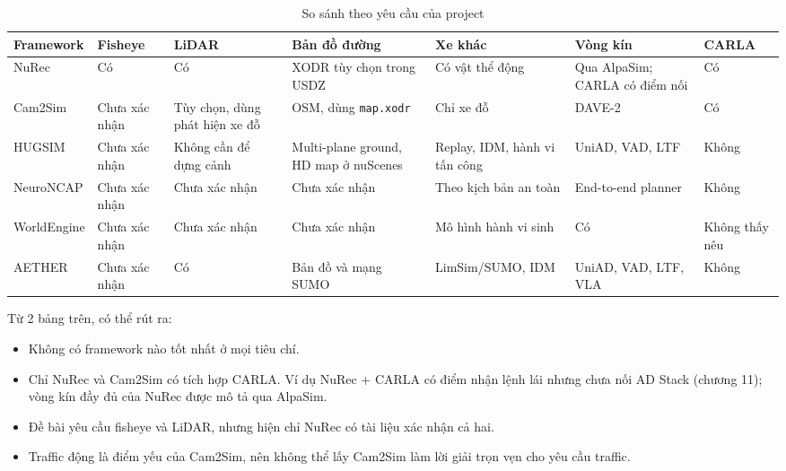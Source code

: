 \begin{table}[H]
  \centering
  \footnotesize
  \caption{So sánh theo yêu cầu của project}
  \begin{tabularx}{\linewidth}{>{\raggedright\arraybackslash}p{1.85cm} >{\raggedright\arraybackslash}p{1.35cm} >{\raggedright\arraybackslash}p{1.6cm} >{\raggedright\arraybackslash}X >{\raggedright\arraybackslash}X >{\raggedright\arraybackslash}X >{\raggedright\arraybackslash}p{1.45cm}}
    \toprule
    \textbf{Framework} & \textbf{Fisheye} & \textbf{LiDAR} & \textbf{Bản đồ đường} & \textbf{Xe khác} & \textbf{Vòng kín} & \textbf{CARLA} \\
    \midrule
    NuRec & Có & Có & XODR tùy chọn trong USDZ & Có vật thể động & Qua AlpaSim; CARLA có điểm nối & Có \\
    \addlinespace
    Cam2Sim & Chưa xác nhận & Tùy chọn, dùng phát hiện xe đỗ & OSM, dùng \texttt{map.xodr} & Chỉ xe đỗ & DAVE-2 & Có \\
    \addlinespace
    HUGSIM & Chưa xác nhận & Không cần để dựng cảnh & Multi-plane ground, HD map ở nuScenes & Replay, IDM, hành vi tấn công & UniAD, VAD, LTF & Không \\
    \addlinespace
    NeuroNCAP & Chưa xác nhận & Chưa xác nhận & Chưa xác nhận & Theo kịch bản an toàn & End-to-end planner & Không \\
    \addlinespace
    WorldEngine & Chưa xác nhận & Chưa xác nhận & Chưa xác nhận & Mô hình hành vi sinh & Có & Không thấy nêu \\
    \addlinespace
    AETHER & Chưa xác nhận & Có & Bản đồ và mạng SUMO & LimSim/SUMO, IDM & UniAD, VAD, LTF, VLA & Không \\
    \bottomrule
  \end{tabularx}
\end{table}

Từ 2 bảng trên, có thể rút ra:
\begin{itemize}
  \item Không có framework nào tốt nhất ở mọi tiêu chí.
  \item Chỉ NuRec và Cam2Sim có tích hợp CARLA. Ví dụ NuRec + CARLA có điểm nhận lệnh lái nhưng chưa nối AD Stack (chương 11); vòng kín đầy đủ của NuRec được mô tả qua AlpaSim.
  \item Đề bài yêu cầu fisheye và LiDAR, nhưng hiện chỉ NuRec có tài liệu xác nhận cả hai.
  \item Traffic động là điểm yếu của Cam2Sim, nên không thể lấy Cam2Sim làm lời giải trọn vẹn cho yêu cầu traffic.
\end{itemize}

